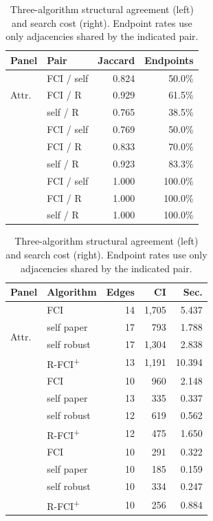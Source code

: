 \documentclass[11pt,a4paper]{article}
\newcommand{\FCIplus}{FCI\textsuperscript{+}}
\begin{document}
\begin{table}[H]
\caption{Three-algorithm structural agreement (left) and search cost (right).
Endpoint rates use only adjacencies shared by the indicated pair.}
\label{tab:agreement-performance}
\centering
\small
\begin{minipage}[t]{0.485\textwidth}
\centering
\begin{tabular}{llrr}
\toprule
Panel & Pair & Jaccard & Endpoints \\
\midrule
\multirow{3}{*}{Attr.}
 & FCI / self & 0.824 & 50.0\% \\
 & FCI / R & 0.929 & 61.5\% \\
 & self / R & 0.765 & 38.5\% \\
\addlinespace
\multirow{3}{*}{Long.}
 & FCI / self & 0.769 & 50.0\% \\
 & FCI / R & 0.833 & 70.0\% \\
 & self / R & 0.923 & 83.3\% \\
\addlinespace
\multirow{3}{*}{Focus.}
 & FCI / self & 1.000 & 100.0\% \\
 & FCI / R & 1.000 & 100.0\% \\
 & self / R & 1.000 & 100.0\% \\
\bottomrule
\end{tabular}
\end{minipage}
\hfill
\begin{minipage}[t]{0.485\textwidth}
\centering
\begin{tabular}{llrrr}
\toprule
Panel & Algorithm & Edges & CI & Sec. \\
\midrule
\multirow{4}{*}{Attr.}
 & FCI & 14 & 1,705 & 5.437 \\
 & self paper & 17 & 793 & 1.788 \\
 & self robust & 17 & 1,304 & 2.838 \\
 & R-\FCIplus{} & 13 & 1,191 & 10.394 \\
\addlinespace
\multirow{4}{*}{Long.}
 & FCI & 10 & 960 & 2.148 \\
 & self paper & 13 & 335 & 0.337 \\
 & self robust & 12 & 619 & 0.562 \\
 & R-\FCIplus{} & 12 & 475 & 1.650 \\
\addlinespace
\multirow{4}{*}{Focus.}
 & FCI & 10 & 291 & 0.322 \\
 & self paper & 10 & 185 & 0.159 \\
 & self robust & 10 & 334 & 0.247 \\
 & R-\FCIplus{} & 10 & 256 & 0.884 \\
\bottomrule
\end{tabular}
\end{minipage}
\end{table}
\end{document}
